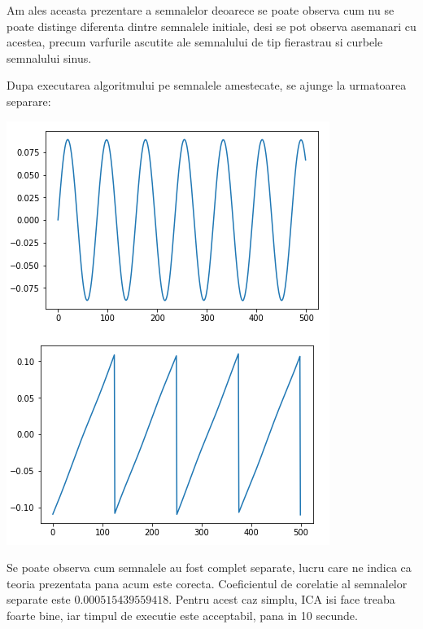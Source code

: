 \documentclass[12pt]{article}
\begin{document}
Am ales aceasta prezentare a semnalelor deoarece se poate observa cum nu se poate distinge diferenta dintre semnalele initiale, desi se pot observa asemanari cu acestea, precum varfurile ascutite ale semnalului de tip fierastrau si curbele semnalului sinus. 

Dupa executarea algoritmului pe semnalele amestecate, se ajunge la urmatoarea separare:
\begin{center}
	\includegraphics[scale=1]{primitives_separated}
 \end{center}

Se poate observa cum semnalele au fost complet separate, lucru care ne indica ca teoria prezentata pana acum este corecta. Coeficientul de corelatie al semnalelor separate este $0.000515439559418$. Pentru acest caz simplu, ICA isi face treaba foarte bine, iar timpul de executie este acceptabil, pana in 10 secunde.
\end{document}
